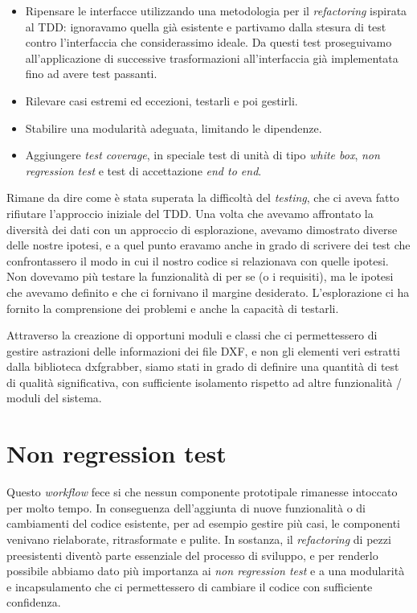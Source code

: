 \documentclass[12pt]{report}
\begin{document}
\begin{itemize}
	\item Ripensare le interfacce utilizzando una metodologia per il \textit{refactoring} ispirata al TDD: ignoravamo quella già esistente e partivamo dalla stesura di test contro l'interfaccia che considerassimo ideale. Da questi test proseguivamo all'applicazione di successive trasformazioni all'interfaccia già implementata fino ad avere test passanti. 
	\item Rilevare casi estremi ed eccezioni, testarli e poi gestirli.
	\item Stabilire una modularità adeguata, limitando le dipendenze.
	\item Aggiungere \textit{test coverage}, in speciale test di unità di tipo \textit{white box}, \textit{non regression test} e test di accettazione \textit{end to end}.
\end{itemize}

Rimane da dire come è stata superata la difficoltà del \textit{testing}, che ci aveva fatto rifiutare l'approccio iniziale del TDD. Una volta che avevamo affrontato la diversità dei dati con un approccio di esplorazione, avevamo dimostrato diverse delle nostre ipotesi, e a quel punto eravamo anche in grado di scrivere dei test che confrontassero il modo in cui il nostro codice si relazionava con quelle ipotesi. Non dovevamo più testare la funzionalità di per se (o i requisiti), ma le ipotesi che avevamo definito e che ci fornivano il margine desiderato. L'esplorazione ci ha fornito la comprensione dei problemi e anche la capacità di testarli.

Attraverso la creazione di opportuni moduli e classi che ci permettessero di gestire astrazioni delle informazioni dei file DXF, e non gli elementi veri estratti dalla biblioteca dxfgrabber, siamo stati in grado di definire una quantità di test di qualità significativa, con sufficiente isolamento rispetto ad altre funzionalità / moduli del sistema.

\section{Non regression test}

Questo \textit{workflow} fece si che nessun componente prototipale rimanesse intoccato per molto tempo. In conseguenza dell'aggiunta di nuove funzionalità o di cambiamenti del codice esistente, per ad esempio gestire più casi, le componenti venivano rielaborate, ritrasformate e pulite. In sostanza, il \textit{refactoring} di pezzi preesistenti diventò parte essenziale del processo di sviluppo, e per renderlo possibile abbiamo dato più importanza ai \textit{non regression test} e a una modularità e incapsulamento che ci permettessero di cambiare il codice con sufficiente confidenza. 
\end{document}
